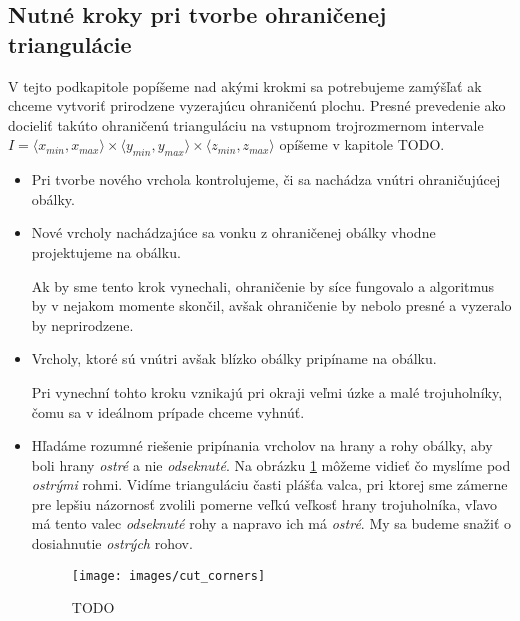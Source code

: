 \subsection{Nutné kroky pri tvorbe ohraničenej triangulácie}

V tejto podkapitole popíšeme nad akými krokmi sa potrebujeme zamýšľať ak chceme vytvoriť prirodzene 
vyzerajúcu ohraničenú plochu. Presné prevedenie
ako docieliť takúto ohraničenú trianguláciu na vstupnom trojrozmernom intervale 
$I = \langle x_{min}, x_{max} \rangle \times \langle y_{min}, y_{max} \rangle \times 
\langle z_{min}, z_{max} \rangle$ opíšeme v kapitole TODO.

\begin{itemize}
    \item{
        Pri tvorbe nového vrchola kontrolujeme, či sa nachádza vnútri ohraničujúcej obálky.
    }
    \item{
        Nové vrcholy nachádzajúce sa vonku z ohraničenej obálky vhodne projektujeme na obálku.

        Ak by sme tento krok vynechali, ohraničenie by síce fungovalo a algoritmus by v nejakom
        momente skončil, avšak ohraničenie by nebolo presné a vyzeralo by neprirodzene.
    }
    \item{
        Vrcholy, ktoré sú vnútri avšak blízko obálky pripíname na obálku.

        Pri vynechní tohto kroku vznikajú pri okraji veľmi úzke a malé trojuholníky, čomu 
        sa v ideálnom prípade chceme vyhnúť.
    }
    \item{
        Hľadáme rozumné riešenie pripínania vrcholov na hrany a rohy obálky, aby boli hrany 
        \textit{ostré} 
        a nie \textit{odseknuté}. Na obrázku \ref{obr:cut_corners} môžeme vidieť čo myslíme pod 
        \textit{ostrými} rohmi. Vidíme trianguláciu časti plášťa valca, pri ktorej sme zámerne pre
        lepšiu názornosť zvolili
        pomerne veľkú veľkosť hrany trojuholníka, vľavo má tento valec 
        \textit{odseknuté} rohy a napravo ich má \textit{ostré}. My sa budeme snažiť o dosiahnutie
        \textit{ostrých} rohov.

        \begin{figure}
            \centerline{\texttt{[image: images/cut\_corners]}}
            \caption[TODO]{TODO}
            \label{obr:cut_corners}
        \end{figure}
    }
\end{itemize}

